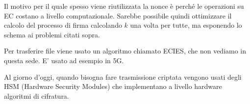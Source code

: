 \begin{remark}
Il motivo per il quale spesso viene riutilizzata la nonce è perché le operazioni su EC costano a livello computazionale. Sarebbe possibile quindi ottimizzare il calcolo del processo di firma calcolando $k$ una volta per tutte, ma esponendo lo schema ai problemi citati sopra.
\end{remark}
\begin{remark}
Per trasferire file viene usato un algoritmo chiamato ECIES, che non vediamo in questa sede. E' usato ad esempio in 5G.
\end{remark}
\begin{remark}
Al giorno d'oggi, quando bisogna fare trasmissione criptata vengono usati degli HSM (Hardware Security Modules) che implementano a livello hardware algoritmi di cifratura.
\end{remark}